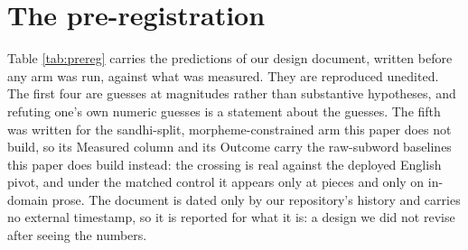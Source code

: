 \documentclass[11pt]{article}
\begin{document}
\section{The pre-registration}
\label{sec:preregistration}



Table \ref{tab:prereg} carries the predictions of our design document, written before any
arm was run, against what was measured. They are reproduced unedited. The first four are
guesses at magnitudes rather than substantive hypotheses, and refuting one's own numeric
guesses is a statement about the guesses. The fifth was written for the sandhi-split,
morpheme-constrained arm this paper does not build, so its Measured column and its Outcome
carry the raw-subword baselines this paper does build instead: the crossing is real against
the deployed English pivot, and under the matched control it appears only at
\numVocabHuge{} pieces and only on in-domain prose. The document is dated only by our repository's history and carries
no external timestamp, so it is reported for what it is: a design we did not revise after
seeing the numbers.
\end{document}

